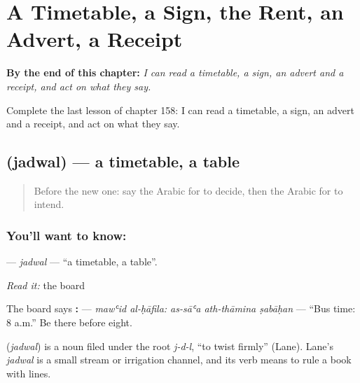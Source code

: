 
\chapter{A Timetable, a Sign, the Rent, an Advert, a Receipt}
\label{ch:ar-a-timetable-a-sign-the-rent-an-advert-a-receipt}

\begin{chapteropening}
\textbf{By the end of this chapter:} \emph{I can read a timetable, a sign, an advert and a receipt, and act on what they say.}

Complete the last lesson of chapter 158: I can read a timetable, a sign, an advert and a receipt, and act on what they say.
\end{chapteropening}

\section[\texorpdfstring{\ar{جدول} (jadwal)}{جدول (jadwal)}]{ (jadwal) — a timetable, a table}

\label{lesson:AR-C158-jadwal}



\begin{quote}
Before the new one: say the Arabic for to decide, then the Arabic for to intend.
\end{quote}

\subsection*{You'll want to know: }
\textbf{} — \emph{jadwal} — \textquotedblleft{}a timetable, a table\textquotedblright{}.

\emph{Read it:} the board

The board says \textbf{ :   } — \emph{mawʿid al-ḥāfila: as-sāʿa ath-thāmina ṣabāḥan} — \textquotedblleft{}Bus time: 8 a.m.\textquotedblright{} Be there before eight.

\begin{cousinweb}
\textbf{} (\emph{jadwal}) is a noun filed under the root \emph{j-d-l}, \textquotedblleft{}to twist firmly\textquotedblright{} (Lane). Lane's \emph{jadwal} is a small stream or irrigation channel, and its verb means to rule a book with lines.
\end{cousinweb}

